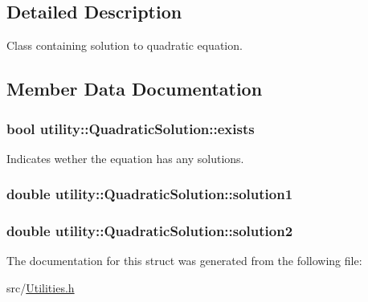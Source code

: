 \subsection{Detailed Description}
Class containing solution to quadratic equation. 

\subsection{Member Data Documentation}
\subsubsection[{\texorpdfstring{exists}{exists}}]{\setlength{\rightskip}{0pt plus 5cm}bool utility\+::\+Quadratic\+Solution\+::exists}\hypertarget{structutility_1_1QuadraticSolution_a76dd00a33b769e90b158877ffc0dc7ee}{}\label{structutility_1_1QuadraticSolution_a76dd00a33b769e90b158877ffc0dc7ee}


Indicates wether the equation has any solutions. 

\subsubsection[{\texorpdfstring{solution1}{solution1}}]{\setlength{\rightskip}{0pt plus 5cm}double utility\+::\+Quadratic\+Solution\+::solution1}\hypertarget{structutility_1_1QuadraticSolution_ad5483ce614475c079a24d3fda275b98e}{}\label{structutility_1_1QuadraticSolution_ad5483ce614475c079a24d3fda275b98e}
\subsubsection[{\texorpdfstring{solution2}{solution2}}]{\setlength{\rightskip}{0pt plus 5cm}double utility\+::\+Quadratic\+Solution\+::solution2}\hypertarget{structutility_1_1QuadraticSolution_a0841bdbfa4b63ae9e4d0ae95e258f319}{}\label{structutility_1_1QuadraticSolution_a0841bdbfa4b63ae9e4d0ae95e258f319}


The documentation for this struct was generated from the following file\+:\begin{DoxyCompactItemize}
\item 
src/\hyperlink{Utilities_8h}{Utilities.\+h}\end{DoxyCompactItemize}
